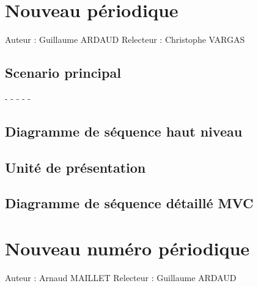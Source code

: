 \documentclass[a4paper,10pt]{report}
\begin{document}
\chapter*{Nouveau périodique}

Auteur : Guillaume ARDAUD
Relecteur : Christophe VARGAS

\bigskip
\section*{Scenario principal}
\begin{flushleft}
-
-
-
-
-
\end{flushleft}

\bigskip

\section*{Diagramme de séquence haut niveau}

\newpage

\section*{Unité de présentation}

\section*{Diagramme de séquence détaillé MVC}

\newpage


\chapter*{Nouveau numéro périodique}

Auteur : Arnaud MAILLET
Relecteur : Guillaume ARDAUD
\end{document}

